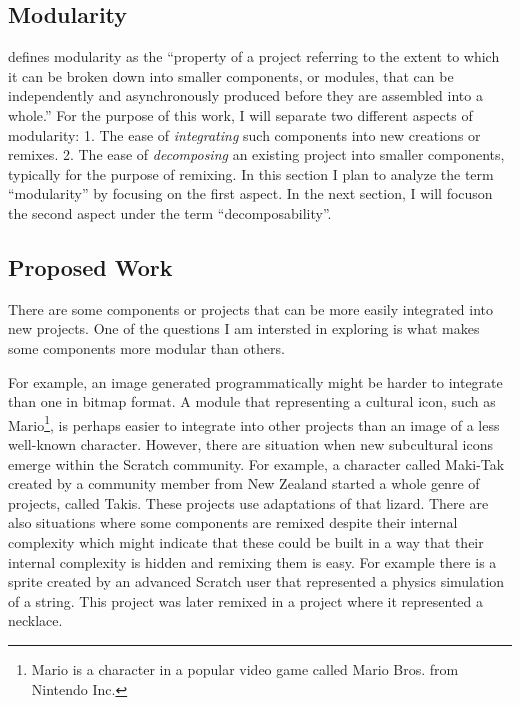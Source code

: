 \subsection{Modularity}
\citet{benkler_coases_2002} defines modularity as the ``property of a project referring to the extent to which it can be broken down into smaller components, or modules, that can be independently and asynchronously produced before they are assembled into a whole.''
For the purpose of this work, I will separate two different aspects of modularity:
1. The ease of \emph{integrating} such components into new creations or remixes.
2. The ease of \emph{decomposing} an existing project into smaller components, typically for the purpose of remixing.
In this section I plan to analyze the term ``modularity'' by focusing on the first aspect.
In the next section, I will focuson the second aspect under the term ``decomposability''.

\subsection{Proposed Work}
There are some components or projects that can be more easily integrated into new projects. 
One of the questions I am intersted in exploring is what makes some components more modular than others.

For example, an image generated programmatically might be harder to integrate than one in bitmap format. 
A module that representing a cultural icon, such as Mario\footnote{Mario is a character in a popular video game called Mario Bros. from Nintendo Inc.}, is perhaps easier to integrate into other projects than an image of a less well-known character.
However, there are situation when new subcultural icons emerge within the Scratch community.
For example, a character called Maki-Tak created by a community member from New Zealand started a whole genre of projects, called Takis.
These projects use adaptations of that lizard. 
There are also situations where some components are remixed despite their internal complexity which might indicate that these could be built in a way that their internal complexity is hidden and remixing them is easy. 
For example there is a sprite created by an advanced Scratch user that represented a physics simulation of a string. 
This project was later remixed in a project where it represented a necklace.

